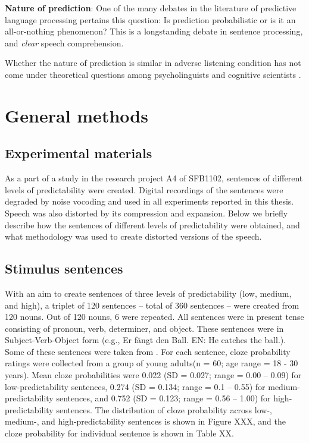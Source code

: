 \documentclass[a4paper, nobind]{templates/ociamthesis}
\begin{document}
\textbf{Nature of prediction}:
One of the many debates in the literature of predictive language processing pertains this question: Is prediction probabilistic or is it an all-or-nothing phenomenon?
This is a longstanding debate in sentence processing, and \emph{clear} speech comprehension.

Whether the nature of prediction is similar in adverse listening condition has not come under theoretical questions among psycholinguists and cognitive scientists \autocites[cf.][]{Strauss2013,Corps2020}.

\hypertarget{general-methods}{%
\chapter{General methods}\label{general-methods}}

\hypertarget{experimental-materials}{%
\section{Experimental materials}\label{experimental-materials}}

As a part of a study in the research project A4 of SFB1102, sentences of different levels of predictability were created.
Digital recordings of the sentences were degraded by noise vocoding and used in all experiments reported in this thesis.
Speech was also distorted by its compression and expansion.
Below we briefly describe how the sentences of different levels of predictability were obtained,
and what methodology was used to create distorted versions of the speech.

\hypertarget{stimulus-sentences}{%
\section{Stimulus sentences}\label{stimulus-sentences}}

With an aim to create sentences of three levels of predictability (low, medium, and high), a triplet of 120 sentences -- total of 360 sentences -- were created from 120 nouns.
Out of 120 nouns, 6 were repeated.
All sentences were in present tense consisting of pronoun, verb, determiner, and object.
These sentences were in Subject-Verb-Object form (e.g., Er fängt den Ball. EN: He catches the ball.).
Some of these sentences were taken from \textcite{Obleser2010}.
For each sentence, cloze probability ratings were collected from a group of young adults(n = 60; age range = 18 - 30 years).
Mean cloze probabilities were 0.022 (SD = 0.027; range = 0.00 -- 0.09) for low-predictability sentences,
0.274 (SD = 0.134; range = 0.1 -- 0.55) for medium-predictability sentences,
and 0.752 (SD = 0.123; range = 0.56 -- 1.00) for high-predictability sentences.
The distribution of cloze probability across low-, medium-, and high-predictability sentences is shown in Figure XXX,
and the cloze probability for individual sentence is shown in Table XX.
\end{document}

